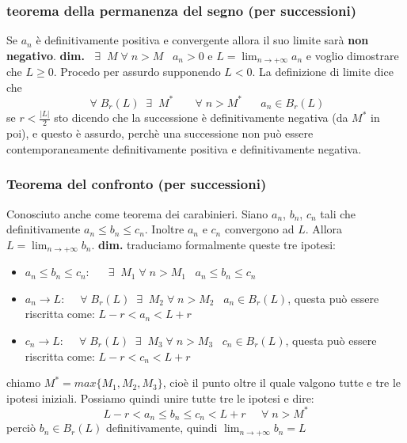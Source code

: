 \subsubsection*{teorema della permanenza del segno (per successioni)}
Se $a_n$ è definitivamente positiva e convergente allora il suo limite sarà \textbf{non negativo}.
\newline
\textbf{dim.}\newline
$\;\;\exists\;\; M \;\forall\; n > M \;\;\; a_n > 0$ e $ L = \lim_{n\rightarrow  + \infty} a_n$ e voglio dimostrare che $L \geq 0$.\newline
Procedo per assurdo supponendo $L < 0$.\newline
La definizione di limite dice che 
\[
    \;\forall\; B_r(L) \;\;\exists\;\; M^* \;\;\;\;\;\; \;\forall\; n> M^* \;\;\;\;\;\; a_n \in B_r(L)
\]
se $r< \frac{|L|}{2}$ sto dicendo che la successione è definitivamente negativa (da $M^*$ in poi), e questo è assurdo, perchè una successione non può essere contemporaneamente definitivamente positiva e definitivamente negativa.
\subsubsection*{Teorema del confronto (per successioni)}
Conosciuto anche come teorema dei carabinieri. \newline
Siano $a_n$, $b_n$, $c_n$ tali che definitivamente $a_n \leq b_n \leq c_n$. Inoltre $a_n$ e $c_n$ convergono ad $L$. Allora $L= \lim_{n\rightarrow +\infty}b_n$.\newline
\textbf{dim.} traduciamo formalmente queste tre ipotesi:
\begin{itemize}
    \item $a_n \leq b_n \leq c_n$: $\;\;\;\;\;\exists\;\;M_1 \;\forall\;n > M_1 \;\;\; a_n \leq b_n \leq c_n$
    \item $a_n \rightarrow L$: $ \;\;\;\;\forall\;B_r(L) \;\;\exists\;\; M_2 \;\forall\;n >M_2 \;\;\; a_n \in B_r(L)$, questa può essere riscritta come: $L-r < a_n < L+r$
    \item $c_n \rightarrow L$: $ \;\;\;\;\forall\;B_r(L) \;\;\exists\;\; M_3 \;\forall\;n >M_3 \;\;\; c_n \in B_r(L)$, questa può essere riscritta come: $L-r < c_n < L+r$
\end{itemize}
chiamo $M^* = max\{M_1, M_2, M_3\}$, cioè il punto oltre il quale valgono tutte e tre le ipotesi iniziali. \newline
Possiamo quindi unire tutte tre le ipotesi e dire:
\[
    L-r < a_n \leq b_n \leq c_n < L +r \;\;\;\; \;\forall\;n > M^*
\]
perciò $b_n \in B_r(L)$ definitivamente, quindi $\lim_{n\rightarrow + \infty} b_n = L$
\newpage
